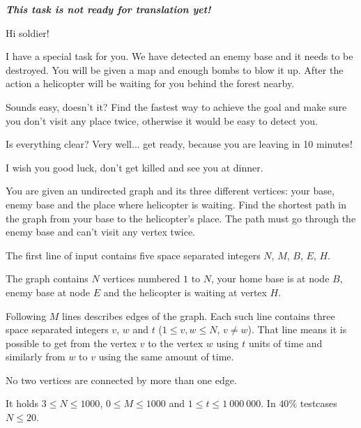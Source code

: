 





\textbf{\textit{This task is not ready for translation yet!}}

\noindent
Hi soldier!

\bigskip \noindent
I have a special task for you. We have detected an enemy base and it needs to be destroyed. You will be given a map and enough bombs to blow it up. After the action a helicopter will be waiting for you behind the forest nearby.

\bigskip \noindent
Sounds easy, doesn't it? Find the fastest way to achieve the goal and make sure you don't visit any place twice, otherwise it would be easy to detect you.

\bigskip \noindent
Is everything clear? Very well... get ready, because you are leaving in 10 minutes!

\bigskip \noindent
I wish you good luck, don't get killed and see you at dinner.


You are given an undirected graph and its three different vertices: your base, enemy base and the place where helicopter is waiting. Find the shortest path in the graph from your base to the helicopter's place. The path must go through the enemy base and can't visit any vertex twice.


The first line of input contains five space separated integers $N$, $M$, $B$, $E$, $H$.

The graph contains $N$ vertices numbered $1$ to $N$, your home base is at node $B$, enemy base at node $E$ and the helicopter is waiting at vertex $H$.

Following $M$ lines describes edges of the graph.
Each such line contains three space separated integers $v$, $w$ and $t$ ($1 \le v, w \le N$, $v \neq w$). That line means it is possible to get from the vertex $v$ to the vertex $w$ using $t$ units of time and similarly from $w$ to $v$ using the same amount of time.

No two vertices are connected by more than one edge.

It holds $3 \le N \le 1000$, $0 \le M \le 1000$ and $1 \le t \le 1\ 000\ 000$.
In $40\%$ testcases $N\le 20$.

